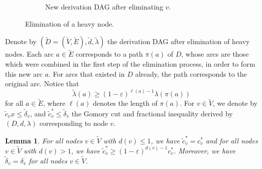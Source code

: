 \documentclass[11pt]{article}
\newcommand{\eps}{\varepsilon}
\newcommand{\rhs}{\delta}
\newtheorem{lemma}[theorem]{Lemma}
\theoremstyle{remark}
\begin{document}
\begin{figure}[t]
\begin{subfigure}[b]{0.45\textwidth}
        \caption{New derivation DAG after eliminating $v$.}
        \label{fig:heavy-node-after}
    \end{subfigure}
    \caption{Elimination of a heavy node.}
    \label{fig:heavy-node-removal}
\end{figure}
Denote by $(\tilde{D}=(\tilde{V}, \tilde{E}),\tilde{d},\tilde{\lambda})$ the derivation DAG after elimination of heavy nodes. Each arc $a \in \tilde{E}$ corresponds to a path $\pi(a)$ of $D$, whose arcs are those which were combined in the first step of the elimination process, in order to form this new arc $a$. For arcs that existed in $D$ already, the path corresponds to the original arc. Notice that
%
\begin{equation}
\label{eq:loss_on_arc}
\tilde{\lambda}(a) \ge (1-\eps)^{\ell(a) - 1} \lambda(\pi(a))
\end{equation}
%
for all $a \in \tilde{E}$, where $\ell(a)$ denotes the length of $\pi(a)$. For $v \in \tilde{V}$, we denote by $\tilde{c}_v x \le \tilde{\rhs}_v$, and $\tilde{c}^*_v \le \tilde{\rhs}_v$ the Gomory cut and fractional inequality derived by $(D,d,\lambda)$ corresponding to node $v$. %

\begin{lemma} \label{lem:loss_control}
For all nodes $v \in \tilde{V}$ with $d(v) \le 1$, we have $\tilde{c}^*_v = c^*_v$ and for all nodes $v \in \tilde{V}$ with $d(v) > 1$, we have $\tilde{c}^*_v \ge (1-\eps)^{d(v)-1}c^*_v$. Moreover, we have $\tilde{\rhs}_v = \rhs_v$ for all nodes $v \in \tilde{V}$. 
\end{lemma}
\end{document}
